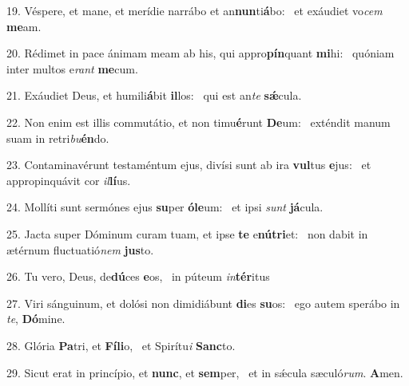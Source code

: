 19. Véspere, et mane, et merídie narrábo et an\textbf{nun}ti\textbf{á}bo: \ast\  et exáudiet vo\textit{cem} \textbf{me}am.\

20. Rédimet in pace ánimam meam ab his, qui appro\textbf{pín}quant \textbf{mi}hi: \ast\  quóniam inter multos e\textit{rant} \textbf{me}cum.\

21. Exáudiet Deus, et humili\textbf{á}bit \textbf{il}los: \ast\  qui est an\textit{te} \textbf{sǽ}cula.\

22. Non enim est illis commutátio, et non timu\textbf{é}runt \textbf{De}um: \ast\  exténdit manum suam in retri\textit{bu}\textbf{én}do.\

23. Contaminavérunt testaméntum ejus, divísi sunt ab ira \textbf{vul}tus \textbf{e}jus: \ast\  et appropinquávit cor \textit{il}\textbf{lí}us.\

24. Mollíti sunt sermónes ejus \textbf{su}per \textbf{ó}\textbf{le}um: \ast\  et ipsi \textit{sunt} \textbf{já}cula.\

25. Jacta super Dóminum curam tuam, et ipse \textbf{te} e\textbf{nú}\textbf{tri}et: \ast\  non dabit in ætérnum fluctuatió\textit{nem} \textbf{jus}to.\

26. Tu vero, Deus, de\textbf{dú}ces \textbf{e}os, \ast\  in púteum \textit{in}\textbf{tér}itus\

27. Viri sánguinum, et dolósi non dimidiábunt \textbf{di}es \textbf{su}os: \ast\  ego autem sperábo in \textit{te}, \textbf{Dó}mine.\

28. Glória \textbf{Pa}tri, et \textbf{Fí}\textbf{li}o, \ast\  et Spirítu\textit{i} \textbf{Sanc}to.\

29. Sicut erat in princípio, et \textbf{nunc}, et \textbf{sem}per, \ast\  et in sǽcula sæculó\textit{rum}. \textbf{A}men.\

